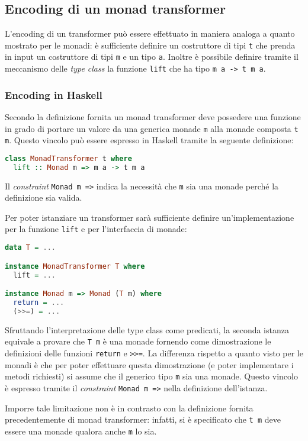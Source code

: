 \subsection{Encoding di un monad transformer}
L'encoding di un transformer può essere effettuato in maniera analoga a quanto mostrato per le monadi: è sufficiente definire un costruttore di tipi \lstinline{t} che prenda in input un costruttore di tipi \lstinline{m} e un tipo \lstinline{a}. Inoltre è possibile definire tramite il meccanismo delle \emph{type class} la funzione \lstinline{lift} che ha tipo \lstinline{m a -> t m a}.

\subsubsection{Encoding in Haskell}
Secondo la definizione fornita un monad transformer deve possedere una funzione in grado di portare un valore da una generica monade \lstinline{m} alla monade composta \lstinline{t m}. Questo vincolo può essere espresso in Haskell tramite la seguente definizione:
\begin{lstlisting}[language=haskell]
class MonadTransformer t where
  lift :: Monad m => m a -> t m a
\end{lstlisting}
Il \emph{constraint} \lstinline{Monad m =>} indica la necessità che \lstinline{m} sia una monade perché la definizione sia valida.

Per poter istanziare un transformer sarà sufficiente definire un'implementazione per la funzione \lstinline{lift} e per l'interfaccia di monade:
\begin{lstlisting}[language=haskell]
data T = ...

instance MonadTransformer T where
  lift = ...

instance Monad m => Monad (T m) where
  return = ...
  (>>=) = ...
\end{lstlisting}
Sfruttando l'interpretazione delle type class come predicati, la seconda istanza equivale a provare che \lstinline{T m} è una monade fornendo come dimostrazione le definizioni delle funzioni \lstinline{return} e \lstinline{>>=}. La differenza rispetto a quanto visto per le monadi è che per poter effettuare questa dimostrazione (e poter implementare i metodi richiesti) si assume che il generico tipo \lstinline{m} sia una monade. Questo vincolo è espresso tramite il \emph{constraint} \lstinline{Monad m =>} nella definizione dell'istanza.

Imporre tale limitazione non è in contrasto con la definizione fornita precedentemente di monad transformer: infatti, si è specificato che \lstinline{t m} deve essere una monade qualora anche \lstinline{m} lo sia.

